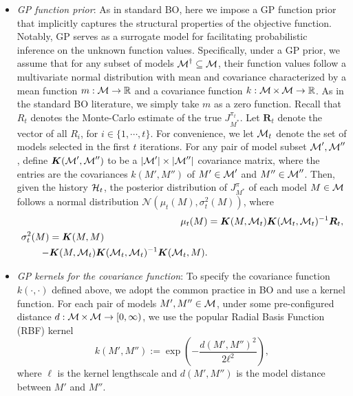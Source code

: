 \begin{itemize}[leftmargin=*]
    \item \textit{GP function prior}:  As in standard BO, here we impose a GP function prior that implicitly captures the structural properties of the objective function. Notably, GP serves as a surrogate model for facilitating probabilistic inference on the unknown function values. Specifically, under a GP prior, we assume that for any subset of models $\operatorname{\mathcal{M}}^\dagger \subseteq \operatorname{\mathcal{M}}$, their function values follow a multivariate normal distribution with mean and covariance characterized by a mean function $m:\operatorname{\mathcal{M}}\rightarrow \mathbb{R}$ and a covariance function $k:\operatorname{\mathcal{M}}\times \operatorname{\mathcal{M}} \rightarrow \mathbb{R}$. As in the standard BO literature, we simply take $m$ as a zero function. Recall that $R_{t}$ denotes the Monte-Carlo estimate of the true $J^{\pi_{t}}_{M^*}$. Let $\bm{R}_t$ denote the vector of all $R_i$, for $i\in \{1,\cdots,t\}$. For convenience, we let $\operatorname{\mathcal{M}}_t$ denote the set of models selected in the first $t$ iterations. 
    For any pair of model subset $\operatorname{\mathcal{M}}',\operatorname{\mathcal{M}}''$, define $\bm{K}(\operatorname{\mathcal{M}}',\operatorname{\mathcal{M}}'')$ to be a $\lvert \operatorname{\mathcal{M}}'\rvert \times \lvert \operatorname{\mathcal{M}}''\rvert$ covariance matrix, where the entries are the covariances $k(M',M'')$ of $M'\in \operatorname{\mathcal{M}}'$ and $M''\in \operatorname{\mathcal{M}}''$.
    Then, given the history $\operatorname{\mathcal{H}}_t$, the posterior distribution of $J^{\pi}_{M^*}$ of each model $M\in \operatorname{\mathcal{M}}$ follows a normal distribution $\mathcal{N}(\mu_t(M),\sigma^2_t(M))$, where
    \begin{align}
    \mu_t(M) &= {\bm{K}(M, \operatorname{\mathcal{M}}_t)} \bm{K}(\operatorname{\mathcal{M}}_t,\operatorname{\mathcal{M}}_t)^{-1} \bm{R}_t,   \\
    \begin{split}    
    \sigma^2_t(M) &= \bm{K}(M, M)\\
        \quad -  &{\bm{K}(M,\operatorname{\mathcal{M}}_t)} \bm{K}(\operatorname{\mathcal{M}}_t,\operatorname{\mathcal{M}}_t)^{-1} \bm{K}(\operatorname{\mathcal{M}}_t, M).
    \end{split}
    \end{align}
    \item \textit{GP kernels for the covariance function}: To specify the covariance function $k(\cdot,\cdot)$ defined above, we adopt the common practice in BO and use a kernel function. For each pair of models $M',M''\in \operatorname{\mathcal{M}}$, under some pre-configured distance $d:\operatorname{\mathcal{M}}\times\operatorname{\mathcal{M}}\rightarrow [0,\infty)$, we use the popular Radial Basis Function (RBF) kernel \citep{williams2006gaussian}
    \begin{equation}
    k(M', M'') := \exp(-\frac{d(M', M'')^\text{2}}{\text{2}\ell^\text{2}}),\label{eq:RBF}
    \end{equation}
    where $\ell$ is the kernel lengthscale and ${d(M', M'')}$ is the model distance between $M'$ and $M''$.

\end{itemize}
